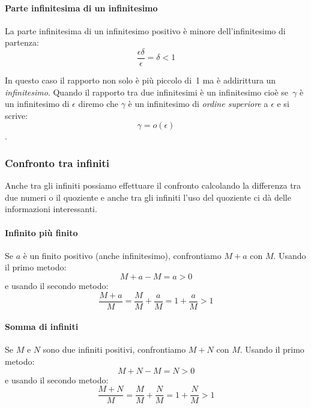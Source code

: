 \paragraph{Parte infinitesima di un infinitesimo}
La parte infinitesima di un infinitesimo positivo è minore 
dell'infinitesimo di partenza:
\[\frac{\epsilon \delta}{\epsilon} = \delta < 1\]

\begin{osservazione}
In questo caso il rapporto non solo è più piccolo di~1 ma è addirittura un 
\emph{infinitesimo}. 
Quando il rapporto tra due infinitesimi è un infinitesimo cioè 
se~\(\gamma\) è un infinitesimo di \(\epsilon\)
diremo che \(\gamma\) è un infinitesimo di \emph{ordine superiore} a 
\(\epsilon\) e si scrive:
\[\gamma=o(\epsilon)\].
\end{osservazione}

\subsubsection{Confronto tra infiniti}
\label{subsubsec:insnum_confrontoreali}

Anche tra gli infiniti possiamo effettuare il confronto calcolando la 
differenza tra due numeri o il quoziente e anche tra gli infiniti l'uso del 
quoziente ci dà delle informazioni interessanti.


\paragraph{Infinito più finito}
Se \(a\) è un finito positivo (anche infinitesimo), confrontiamo \(M+a\) 
con \(M\). 
Usando il primo metodo:
\[M+a-M = a > 0\]
e usando il secondo metodo: 
\[\frac{M+a}{M} =
  \frac{M}{M} + \frac{a}{M} = 
  1 + \frac{a}{M} > 1\]

\paragraph{Somma di infiniti}
Se \(M\) e \(N\) sono due infiniti positivi, confrontiamo \(M+N\) 
con \(M\). 
Usando il primo metodo:
\[M+N-M = N > 0\]
e usando il secondo metodo: 
\[\frac{M+N}{M} =
  \frac{M}{M} + \frac{N}{M} = 
  1 + \frac{N}{M} > 1\]

